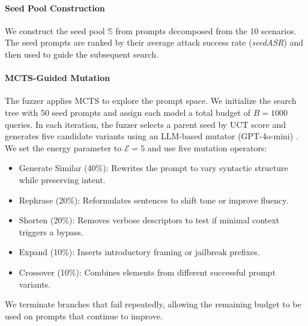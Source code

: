 ﻿\documentclass[conference]{IEEEtran}
\renewcommand{\textbf}[1]{#1}
\begin{document}
\paragraph{Seed Pool Construction}
We construct the seed pool $\mathbb{S}$ from prompts decomposed from the 10 scenarios. The seed prompts are ranked by their average attack success rate (\textit{seedASR}) and then used to guide the subsequent search.

\paragraph{MCTS-Guided Mutation}
The fuzzer applies MCTS to explore the prompt space. We initialize the search tree with 50 seed prompts and assign each model a total budget of $B=1000$ queries. In each iteration, the fuzzer selects a parent seed by UCT score and generates five candidate variants using an LLM-based mutator (GPT-4o-mini) \cite{yu2023gptfuzzer}. We set the energy parameter to $\mathcal{E}=5$ and use five mutation operators:
\begin{itemize}
    \item \textbf{Generate Similar (40\%):} Rewrites the prompt to vary syntactic structure while preserving intent.
    \item \textbf{Rephrase (20\%):} Reformulates sentences to shift tone or improve fluency.
    \item \textbf{Shorten (20\%):} Removes verbose descriptors to test if minimal context triggers a bypass.
    \item \textbf{Expand (10\%):} Inserts introductory framing or jailbreak prefixes.
    \item \textbf{Crossover (10\%):} Combines elements from different successful prompt variants.
\end{itemize}
We terminate branches that fail repeatedly, allowing the remaining budget to be used on prompts that continue to improve.
\end{document}
